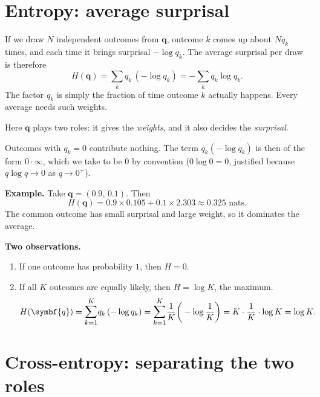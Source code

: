 \documentclass[12pt,a4paper]{article}
\begin{document}
\section{Entropy: average surprisal}

If we draw $N$ independent outcomes from $\symbf{q}$,
outcome $k$ comes up about $N q_k$ times, and each time
it brings surprisal $-\log q_k$. The average surprisal
per draw is therefore
\begin{equation}
  H(\symbf{q}) = \sum_{k} q_k \,(-\log q_k) = -\sum_{k} q_k \log q_k .
  \label{eq:entropy}
\end{equation}
The factor $q_k$ is simply the fraction of time outcome
$k$ actually happens. Every average needs such weights.

Here $\symbf{q}$ plays two roles: it gives the
\emph{weights}, and it also decides the \emph{surprisal}.

Outcomes with $q_k = 0$ contribute nothing. The term
$q_k(-\log q_k)$ is then of the form $0 \cdot \infty$,
which we take to be $0$ by convention
($0 \log 0 = 0$, justified because $q \log q \to 0$
as $q \to 0^{+}$).

\textbf{Example.} Take $\symbf{q} = (0.9,\, 0.1)$. Then
\begin{equation}
  H(\symbf{q}) = 0.9 \times 0.105 + 0.1 \times 2.303 \approx 0.325 \text{ nats}.
  \label{eq:example}
\end{equation}
The common outcome has small surprisal and large
weight, so it dominates the average.

\textbf{Two observations.}
\begin{enumerate}
    \item If one outcome has probability
            $1$, then $H = 0$.

    \item If all $K$ outcomes are equally
    likely, then $H = \log K$, the maximum.
    \begin{equation}
        H(\symbf{q})
        = \mathlarger{\sum_{k=1}^{K}} q_k \,(-\log q_k)
        = \mathlarger{\sum_{k=1}^{K}} \dfrac{1}{K} \bigg(-\log \dfrac{1}{K}\bigg)
        = K \cdot \dfrac{1}{K} \cdot \log K
        = \log K.
        \label{eq:uniform}
    \end{equation}
\end{enumerate}

\section{Cross-entropy: separating the two roles}
\end{document}

